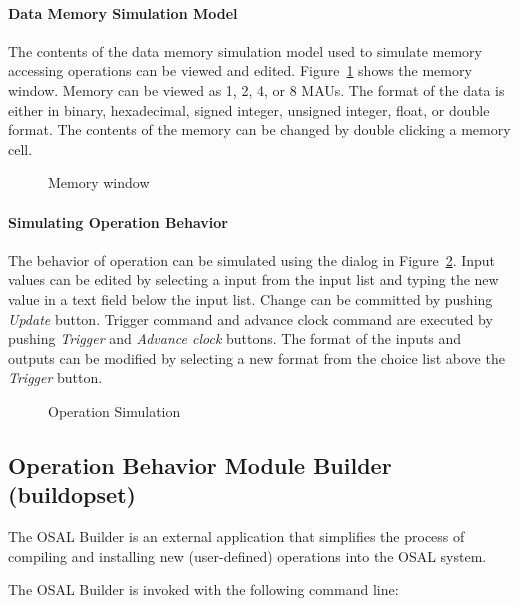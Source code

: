 \documentclass[a4paper,twoside]{tceusermanual}
\begin{document}
\paragraph{Data Memory Simulation Model}

The contents of the data memory simulation model used to simulate
memory accessing operations can be viewed and edited.
Figure~\ref{fig:osed_memory_dialog}
shows the memory window. Memory can be viewed as 1, 2, 4, or 8 MAUs.
The format of the data is either in binary, hexadecimal, signed integer,
unsigned integer, float, or double format.
The contents of the memory can be changed by double clicking a memory cell. 

\begin{figure}[tb]
\centerline{}
\caption{Memory window}
\label{fig:osed_memory_dialog}
\end{figure}

\paragraph{Simulating Operation Behavior}

The behavior of operation can be simulated using the dialog in 
Figure~\ref{fig:osed_simulate_dialog}. Input values can be edited by selecting
a input from the input list and typing the new value in a text field below
the input list. Change can be committed by pushing \emph{Update} button.
Trigger command and advance clock command are executed 
by pushing \emph{Trigger} and \emph{Advance clock} buttons.
The format of the inputs and outputs can be modified by selecting a new format
from the choice list above the \emph{Trigger} button.

\begin{figure}[tb]
\centerline{}
\caption{Operation Simulation}
\label{fig:osed_simulate_dialog}
\end{figure}

\subsection{Operation Behavior Module Builder (buildopset)}
\label{sec:buildopset}

The OSAL Builder is an external application that simplifies the process of
compiling and installing new (user-defined) operations into the OSAL system.

The OSAL Builder is invoked with the following command line:
\end{document}
